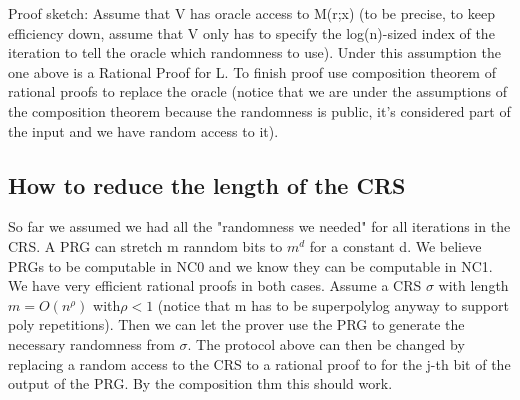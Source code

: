 Proof sketch:
Assume that V has oracle access to M(r;x) (to be precise, to keep efficiency down, assume that V only has to specify the log(n)-sized index of the iteration to tell the oracle which randomness to use).
Under this assumption the one above is a Rational Proof for L. To finish proof use composition theorem of rational proofs to replace the oracle (notice that we are under the assumptions of the composition theorem because the randomness is public, it's considered part of the input and we have random access to it).


\subsection{ How to reduce the length of the CRS }

So far we assumed we had all the "randomness we needed" for all iterations in the CRS.
A PRG can stretch m ranndom bits to $m^d$ for a constant d. We believe PRGs to be computable in NC0 and we know they can be computable in NC1. We have very efficient rational proofs in both cases.
Assume a CRS $\sigma$ with length $m = O(n^\rho)$ with$ \rho < 1$ (notice that m has to be superpolylog anyway to support poly repetitions). Then we can let the prover use the PRG to generate the necessary randomness
from $\sigma$. The protocol above can then be changed by replacing a random access to the CRS to a rational proof to for the j-th bit of the output of the PRG. By the composition thm this should work.



